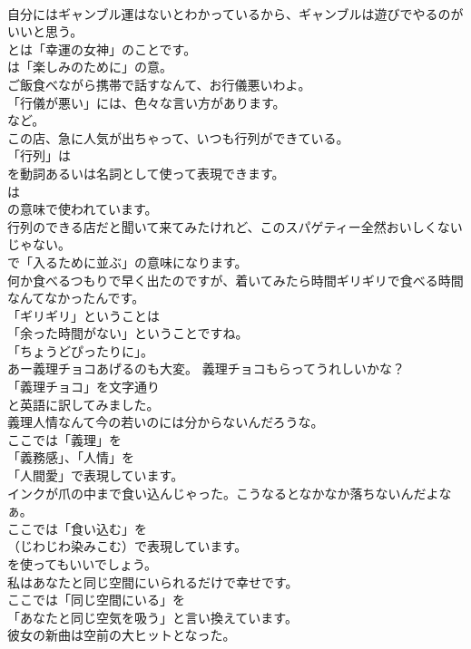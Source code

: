 \documentclass[8pt]{extreport}
\begin{document}
\begin{CJK}{UTF8}{min}
\\	自分にはギャンブル運はないとわかっているから、ギャンブルは遊びでやるのがいいと思う。 
\\	とは「幸運の女神」のことです。
\\	は「楽しみのために」の意。	
\\	ご飯食べながら携帯で話すなんて、お行儀悪いわよ。 
\\	「行儀が悪い」には、色々な言い方があります。
\\	など。	
\\	この店、急に人気が出ちゃって、いつも行列ができている。 
\\	「行列」は
\\	を動詞あるいは名詞として使って表現できます。
\\	は
\\	の意味で使われています。	
\\	行列のできる店だと聞いて来てみたけれど、このスパゲティー全然おいしくないじゃない。 
\\	で「入るために並ぶ」の意味になります。	
\\	何か食べるつもりで早く出たのですが、着いてみたら時間ギリギリで食べる時間なんてなかったんです。 
\\	「ギリギリ」ということは
\\	「余った時間がない」ということですね。
\\	「ちょうどぴったりに」。	
\\	あー義理チョコあげるのも大変。 義理チョコもらってうれしいかな？ 
\\	「義理チョコ」を文字通り
\\	と英語に訳してみました。	
\\	義理人情なんて今の若いのには分からないんだろうな。 
\\	ここでは「義理」を
\\	「義務感」、「人情」を
\\	「人間愛」で表現しています。	
\\	インクが爪の中まで食い込んじゃった。こうなるとなかなか落ちないんだよなぁ。 
\\	ここでは「食い込む」を 
\\	（じわじわ染みこむ）で表現しています。
\\	を使ってもいいでしょう。	
\\	私はあなたと同じ空間にいられるだけで幸せです。 
\\	ここでは「同じ空間にいる」を
\\	「あなたと同じ空気を吸う」と言い換えています。	
\\	彼女の新曲は空前の大ヒットとなった。 

\end{CJK}
\end{document}
